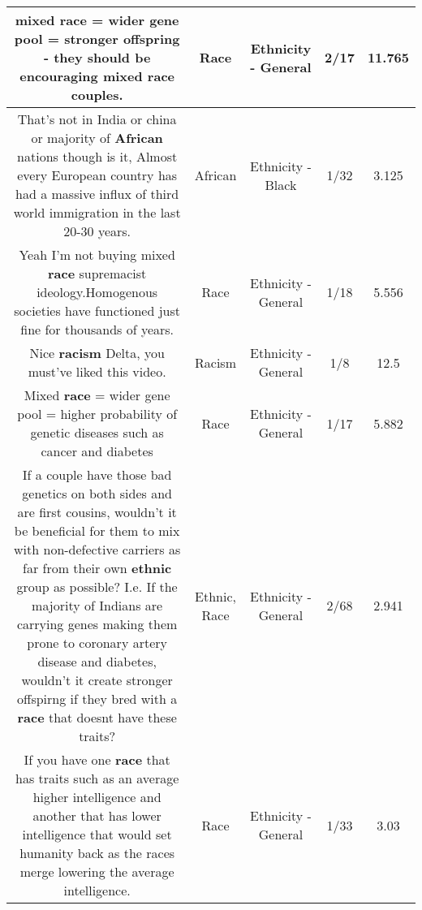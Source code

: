 \documentclass[11pt]{article}
\newlength\mylength
\begin{document}
\begin{center}
\begin{longtable}{|C{.65\mylength}|C{.30\mylength}|C{.12\mylength}|C{.12\mylength}|C{.12\mylength}|}
  \small mixed \textbf{race} = wider gene pool = stronger offspring - they should be encouraging mixed \textbf{race} couples.\normalsize   & Race & Ethnicity - General & 2/17 & 11.765 \\  \hline
  \small That's not in India or china or majority of \textbf{African} nations though is it, Almost every European country has had a massive influx of third world immigration in the last 20-30 years.\normalsize   & African & Ethnicity - Black & 1/32 & 3.125 \\  \hline
  \small Yeah I'm not buying mixed \textbf{race} supremacist ideology.Homogenous societies have functioned just fine for thousands of years.\normalsize   & Race & Ethnicity - General & 1/18 & 5.556 \\  \hline
  \small Nice \textbf{racism} Delta, you must've liked this video.\normalsize   & Racism & Ethnicity - General & 1/8 & 12.5 \\  \hline
  \small Mixed \textbf{race} = wider gene pool = higher probability of genetic diseases such as cancer and diabetes\normalsize   & Race & Ethnicity - General & 1/17 & 5.882 \\  \hline
  \small If a couple have those bad genetics on both sides and are first cousins, wouldn't it be beneficial for them to mix  with non-defective carriers as far from their own \textbf{ethnic} group as possible? I.e. If  the majority of Indians are carrying genes making them prone to coronary artery disease and diabetes, wouldn't  it create stronger offspirng if they bred with a \textbf{race} that doesnt have these traits?\normalsize   & Ethnic, Race & Ethnicity - General & 2/68 & 2.941 \\  \hline
  \small If you have one \textbf{race} that has traits such as an average higher  intelligence and another  that has lower intelligence that would set humanity back as the races merge lowering the average intelligence.\normalsize   & Race & Ethnicity - General & 1/33 & 3.03 \\  \hline

\end{longtable}
\end{center}
\end{document}
